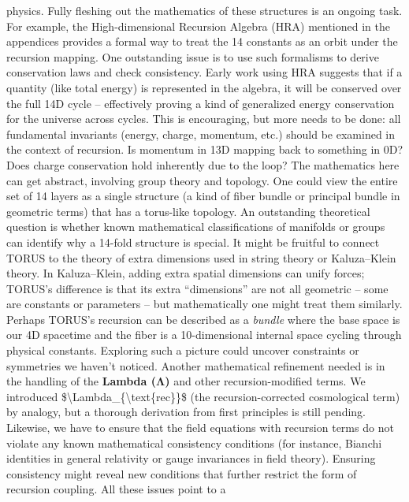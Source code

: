 \documentclass[]{article}
\begin{document}
\begin{itemize}
  physics. Fully fleshing out the mathematics of these structures is an
  ongoing task. For example, the High-dimensional Recursion Algebra
  (HRA) mentioned in the appendices provides a formal way to treat the
  14 constants as an orbit under the recursion mapping​. One outstanding
  issue is to use such formalisms to derive conservation laws and check
  consistency. Early work using HRA suggests that if a quantity (like
  total energy) is represented in the algebra, it will be conserved over
  the full 14D cycle​ -- effectively proving a kind of generalized
  energy conservation for the universe across cycles. This is
  encouraging, but more needs to be done: all fundamental invariants
  (energy, charge, momentum, etc.) should be examined in the context of
  recursion. Is momentum in 13D mapping back to something in 0D? Does
  charge conservation hold inherently due to the loop? The mathematics
  here can get abstract, involving group theory and topology. One could
  view the entire set of 14 layers as a single structure (a kind of
  fiber bundle or principal bundle in geometric terms) that has a
  torus-like topology. An outstanding theoretical question is whether
  known mathematical classifications of manifolds or groups can identify
  why a 14-fold structure is special. It might be fruitful to connect
  TORUS to the theory of extra dimensions used in string theory or
  Kaluza--Klein theory. In Kaluza--Klein, adding extra spatial
  dimensions can unify forces; TORUS's difference is that its extra
  ``dimensions'' are not all geometric -- some are constants or
  parameters -- but mathematically one might treat them similarly.
  Perhaps TORUS's recursion can be described as a \emph{bundle} where
  the base space is our 4D spacetime and the fiber is a 10-dimensional
  internal space cycling through physical constants. Exploring such a
  picture could uncover constraints or symmetries we haven't noticed.
  Another mathematical refinement needed is in the handling of the
  \textbf{Lambda (Λ)} and other recursion-modified terms. We introduced
  \$\textbackslash{}Lambda\_\{\textbackslash{}text\{rec\}\}\$ (the
  recursion-corrected cosmological term) by analogy, but a thorough
  derivation from first principles is still pending. Likewise, we have
  to ensure that the field equations with recursion terms do not violate
  any known mathematical consistency conditions (for instance, Bianchi
  identities in general relativity or gauge invariances in field
  theory). Ensuring consistency might reveal new conditions that further
  restrict the form of recursion coupling. All these issues point to a

\end{itemize}
\end{document}
